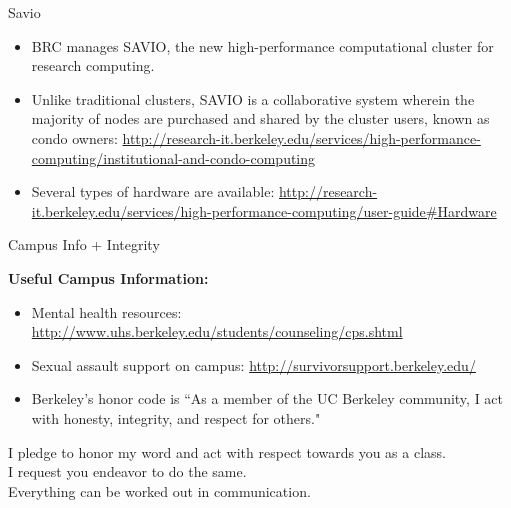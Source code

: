 \documentclass[xcolor=x11names,compress, handout]{beamer}
\renewcommand{\(}{\begin{columns}}
\renewcommand{\)}{\end{columns}}
\newcommand{\<}[1]{\begin{column}{#1}}
\renewcommand{\>}{\end{column}}
\begin{document}
\begin{frame}{Savio}

\begin{itemize}
\item BRC manages SAVIO, the new high-performance computational
cluster for research computing.	

\item Unlike traditional clusters, SAVIO is a collaborative system
wherein the majority of nodes are purchased and shared by the cluster users, known as condo owners: \href{http://research-it.berkeley.edu/services/high-performance-
computing/institutional-and-condo-computing}{http://research-it.berkeley.edu/services/high-performance-
computing/institutional-and-condo-computing}		

\item Several types of hardware are available: \href{http://research-it.berkeley.edu/services/high-performance-computing/user-guide\#Hardware}{http://research-it.berkeley.edu/services/high-performance-computing/user-guide\#Hardware}	
\end{itemize}

\end{frame}


\begin{frame}{Campus Info + Integrity}

\textbf{Useful Campus Information:} 
\begin{itemize}
  \item Mental health resources: \href{http://www.uhs.berkeley.edu/students/counseling/cps.shtml}{http://www.uhs.berkeley.edu/students/counseling/cps.shtml}
  \item Sexual assault support on campus: \href{http://survivorsupport.berkeley.edu/}{http://survivorsupport.berkeley.edu/}
  \item Berkeley’s honor code is ``As a member of the UC Berkeley community, I act with honesty, integrity, and respect for others."
\end{itemize}

\vspace*{1 em}
I pledge to honor my word and act with respect towards you as a class. \\
I request you endeavor to do the same.\\ 
Everything can be worked out in communication. 

\end{frame}
\end{document}

